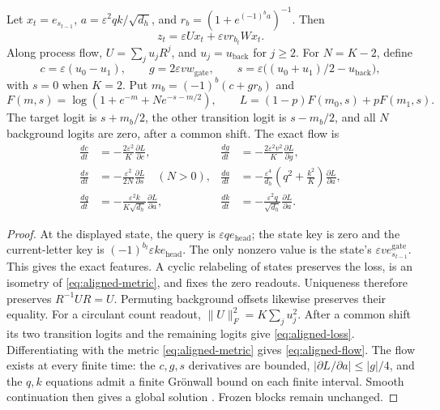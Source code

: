 \begin{lemma}
\label{lem:aligned-reduction}
Let $x_t=e_{s_{t-1}}$, $a=\varepsilon^2qk/\sqrt{d_h}$, and
$r_b=(1+e^{(-1)^ba})^{-1}$. Then
\[
 z_t=\varepsilon Ux_t+\varepsilon v r_{b_t}Wx_t.
\]
Along process flow, $U=\sum_j u_jR^j$, and $u_j=u_{\mathrm{back}}$ for $j\ge2$.
For $N=K-2$, define
\[
 c=\varepsilon(u_0-u_1),\qquad g=2\varepsilon v w_{\mathrm{gate}},\qquad
 s=\varepsilon\bigl((u_0+u_1)/2-u_{\mathrm{back}}\bigr),
\]
with $s=0$ when $K=2$. Put $m_b=(-1)^b(c+gr_b)$ and
\begin{equation}
 F(m,s)=\log(1+e^{-m}+Ne^{-s-m/2}),\qquad
 L=(1-p)F(m_0,s)+pF(m_1,s).
 \label{eq:aligned-loss}
\end{equation}
The target logit is $s+m_b/2$, the other transition logit is $s-m_b/2$, and
all $N$ background logits are zero, after a common shift. The exact flow is
\begin{equation}
\begin{aligned}
 \frac{dc}{dt}&=-\frac{2\varepsilon^2}{K}\frac{\partial L}{\partial c},&
 \frac{dg}{dt}&=-\frac{2\varepsilon^2v^2}{K}\frac{\partial L}{\partial g},\\
 \frac{ds}{dt}&=-\frac{\varepsilon^2}{2N}\frac{\partial L}{\partial s}\quad(N>0),&
 \frac{da}{dt}&=-\frac{\varepsilon^4}{d_h}
       \left(q^2+\frac{k^2}{K}\right)\frac{\partial L}{\partial a},\\
 \frac{dq}{dt}&=-\frac{\varepsilon^2k}{K\sqrt{d_h}}\frac{\partial L}{\partial a},&
 \frac{dk}{dt}&=-\frac{\varepsilon^2q}{\sqrt{d_h}}\frac{\partial L}{\partial a}.
\end{aligned}
\label{eq:aligned-flow}
\end{equation}
\end{lemma}
\begin{proof}
At the displayed state, the query is $\varepsilon q e_{\mathrm{head}}$;
the state key is zero and the current-letter key is
$(-1)^{b_t}\varepsilon k e_{\mathrm{head}}$.
The only nonzero value is the state's $\varepsilon v e_{s_{t-1}}^{\mathrm{gate}}$.
This gives the exact features. A cyclic relabeling of states preserves the loss,
is an isometry of \cref{eq:aligned-metric}, and fixes the zero readouts.
Uniqueness therefore preserves $R^{-1}UR=U$. Permuting background offsets
likewise preserves their equality.
For a circulant count readout, $\|U\|_F^2=K\sum_j u_j^2$.
After a common shift its two transition logits and the remaining logits give
\cref{eq:aligned-loss}. Differentiating with the metric
\cref{eq:aligned-metric} gives \cref{eq:aligned-flow}.
The flow exists at every finite time: the $c,g,s$ derivatives are bounded,
$|\partial L/\partial a|\le|g|/4$, and the $q,k$ equations admit a finite
Gr\"onwall bound on each finite interval. Smooth continuation then gives a global
solution \citep[Corollary~2.15]{teschl2012ode}. Frozen blocks remain unchanged.
\end{proof}

